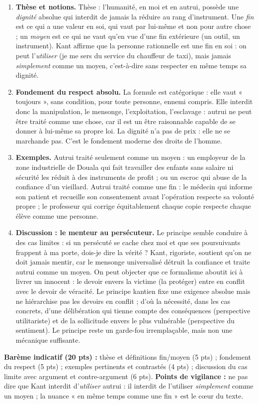 \documentclass[11pt]{article}
\begin{document}
\begin{corrige}
\begin{enumerate}
\item \textbf{Thèse et notions.} Thèse : l'humanité, en moi et en autrui, possède une \emph{dignité} absolue qui interdit de jamais la réduire au rang d'instrument. Une \emph{fin} est ce qui a une valeur en soi, qui vaut par lui-même et non pour autre chose ; un \emph{moyen} est ce qui ne vaut qu'en vue d'une fin extérieure (un outil, un instrument). Kant affirme que la personne rationnelle est une fin en soi : on peut l'\emph{utiliser} (je me sers du service du chauffeur de taxi), mais jamais \emph{simplement} comme un moyen, c'est-à-dire sans respecter en même temps sa dignité.
\item \textbf{Fondement du respect absolu.} La formule est catégorique : elle vaut « toujours », sans condition, pour toute personne, ennemi compris. Elle interdit donc la manipulation, le mensonge, l'exploitation, l'esclavage : autrui ne peut être traité comme une chose, car il est un être raisonnable capable de se donner à lui-même sa propre loi. La dignité n'a pas de prix : elle ne se marchande pas. C'est le fondement moderne des droits de l'homme.
\item \textbf{Exemples.} Autrui traité seulement comme un moyen : un employeur de la zone industrielle de Douala qui fait travailler des enfants sans salaire ni sécurité les réduit à des instruments de profit ; ou un escroc qui abuse de la confiance d'un vieillard. Autrui traité comme une fin : le médecin qui informe son patient et recueille son consentement avant l'opération respecte sa volonté propre ; le professeur qui corrige équitablement chaque copie respecte chaque élève comme une personne.
\item \textbf{Discussion : le menteur au persécuteur.} Le principe semble conduire à des cas limites : si un persécuté se cache chez moi et que ses poursuivants frappent à ma porte, dois-je dire la vérité ? Kant, rigoriste, soutient qu'on ne doit jamais mentir, car le mensonge universalisé détruit la confiance et traite autrui comme un moyen. On peut objecter que ce formalisme aboutit ici à livrer un innocent : le devoir envers la victime (la protéger) entre en conflit avec le devoir de véracité. Le principe kantien fixe une exigence absolue mais ne hiérarchise pas les devoirs en conflit ; d'où la nécessité, dans les cas concrets, d'une délibération qui tienne compte des conséquences (perspective utilitariste) et de la sollicitude envers le plus vulnérable (perspective du sentiment). Le principe reste un garde-fou irremplaçable, mais non une mécanique suffisante.
\end{enumerate}
\textbf{Barème indicatif (20 pts) :} thèse et définitions fin/moyen (5 pts) ; fondement du respect (5 pts) ; exemples pertinents et contrastés (4 pts) ; discussion du cas limite avec argument et contre-argument (6 pts).
\textbf{Points de vigilance :} ne pas dire que Kant interdit d'\emph{utiliser} autrui : il interdit de l'utiliser \emph{simplement} comme un moyen ; la nuance « en même temps comme une fin » est le cœur du texte.
\end{corrige}
\end{document}
